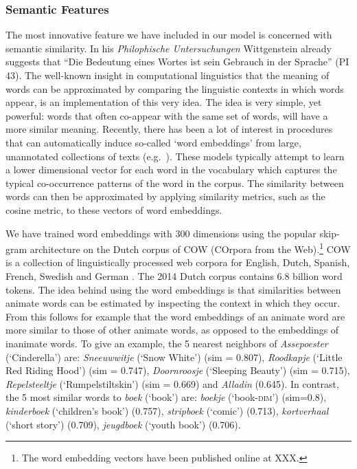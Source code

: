 \documentclass[a4paper,UKenglish]{oasics}
\begin{document}
\subsubsection{Semantic Features} The most innovative feature we have
included in our model is concerned with semantic similarity. In his
\textit{Philophische Untersuchungen} Wittgenstein already suggests
that ``Die Bedeutung eines Wortes ist sein Gebrauch in der Sprache''
(PI 43). The well-known insight in computational linguistics that the
meaning of words can be approximated by comparing the linguistic
contexts in which words appear, is an implementation of this very
idea. The idea is very simple, yet powerful: words that often
co-appear with the same set of words, will have a more similar
meaning. Recently, there has been a lot of interest in procedures that
can automatically induce so-called `word embeddings' from large,
unannotated collections of texts
(e.g.~\cite{mikolov:13,pennington:14}). These models typically attempt
to learn a lower dimensional vector for each word in the vocabulary
which captures the typical co-occurrence patterns of the word in the
corpus. The similarity between words can then be approximated by
applying similarity metrics, such as the cosine metric, to these
vectors of word embeddings.

We have trained word embeddings with 300 dimensions using the popular
skip-gram architecture \cite{mikolov:13} on the Dutch corpus of COW
(COrpora from the Web).\footnote{The word embedding vectors have been
  published online at XXX.} COW is a collection of linguistically
processed web corpora for English, Dutch, Spanish, French, Swedish and
German \cite{schaefer:12}. The 2014 Dutch corpus contains 6.8 billion
word tokens. The idea behind using the word embeddings is that
similarities between animate words can be estimated by inspecting the
context in which they occur. From this follows for example that the word
embeddings of an animate word are more similar to those of other
animate words, as opposed to the embeddings of inanimate words. To give an
example, the 5 nearest neighbors of \textit{Assepoester}
(`Cinderella') are: \textit{Sneeuwwitje} (`Snow White') (sim = 0.807),
\textit{Roodkapje} (`Little Red Riding Hood') (sim = 0.747),
\textit{Doornroosje} (`Sleeping Beauty') (sim = 0.715),
\textit{Repelsteeltje} (`Rumpelstiltskin') (sim = 0.669) and
\textit{Alladin} (0.645). In contrast, the 5 most similar words to
\textit{boek} (`book') are: \textit{boekje} (`book-\textsc{dim}')
(sim=0.8), \textit{kinderboek} (`children's book') (0.757),
\textit{stripboek} (`comic') (0.713), \textit{kortverhaal} (`short
story') (0.709), \textit{jeugdboek} (`youth book') (0.706).
\end{document}
